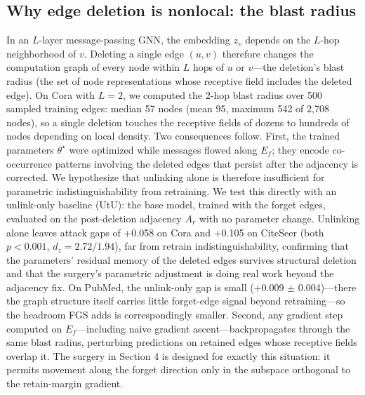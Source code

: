 \documentclass[pdflatex,sn-basic,Numbered]{sn-jnl}
\begin{document}
\subsection{Why edge deletion is nonlocal: the blast radius}
In an $L$-layer message-passing GNN, the embedding $z_v$ depends on the $L$-hop neighborhood of $v$. Deleting a single edge $(u, v)$ therefore changes the computation graph of every node within $L$ hops of $u$ or $v$---the deletion's blast radius (the set of node representations whose receptive field includes the deleted edge). On Cora with $L = 2$, we computed the 2-hop blast radius over 500 sampled training edges: median 57 nodes (mean 95, maximum 542 of 2,708 nodes), so a single deletion touches the receptive fields of dozens to hundreds of nodes depending on local density. Two consequences follow. First, the trained parameters $\theta^\star$ were optimized while messages flowed along $E_f$; they encode co-occurrence patterns involving the deleted edges that persist after the adjacency is corrected. We hypothesize that unlinking alone is therefore insufficient for parametric indistinguishability from retraining. We test this directly with an unlink-only baseline (UtU): the base model, trained with the forget edges, evaluated on the post-deletion adjacency $A_r$ with no parameter change. Unlinking alone leaves attack gaps of +0.058 on Cora and +0.105 on CiteSeer (both $p < 0.001$, $d_z = 2.72/1.94$), far from retrain indistinguishability, confirming that the parameters' residual memory of the deleted edges survives structural deletion and that the surgery's parametric adjustment is doing real work beyond the adjacency fix. On PubMed, the unlink-only gap is small (+0.009 $\pm$ 0.004)---there the graph structure itself carries little forget-edge signal beyond retraining---so the headroom FGS adds is correspondingly smaller. Second, any gradient step computed on $E_f$---including naive gradient ascent---backpropagates through the same blast radius, perturbing predictions on retained edges whose receptive fields overlap it. The surgery in Section 4 is designed for exactly this situation: it permits movement along the forget direction only in the subspace orthogonal to the retain-margin gradient.
\end{document}
